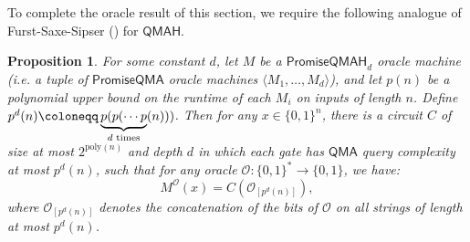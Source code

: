 \documentclass[11pt]{article}%
\newtheorem{proposition}[theorem]{Proposition}
\newcommand{\poly}{\mathrm{poly}}
\begin{document}
To complete the oracle result of this section, we require the following analogue of Furst-Saxe-Sipser \cite{FSS84} () for $\mathsf{QMAH}$.

\begin{proposition}
\label{prop:qmah_fss}
For some constant $d$, let $M$ be a $\mathsf{PromiseQMAH}_d$ oracle machine (i.e. a tuple of $\mathsf{PromiseQMA}$ oracle machines $\langle M_1, \ldots, M_d \rangle$), and let $p(n)$ be a polynomial upper bound on the runtime of each $M_i$ on inputs of length $n$. Define $p^d(n) \coloneqq \underbrace{p(p( \cdots p}_{d \text{\rm \ times}}(n)))$. Then for any $x \in \{0,1\}^n$, there is a circuit $C$ of size at most $2^{\poly(n)}$ and depth $d$ in which each gate has $\mathsf{QMA}$ query complexity at most $p^d(n)$, such that for any oracle $\mathcal{O}: \{0,1\}^* \to \{0,1\}$, we have:
\[
M^\mathcal{O}(x) = C\left(\mathcal{O}_{[p^d(n)]}\right),
\]
where $\mathcal{O}_{[p^d(n)]}$ denotes the concatenation of the bits of $\mathcal{O}$ on all strings of length at most $p^d(n)$.
\end{proposition}
\end{document}
